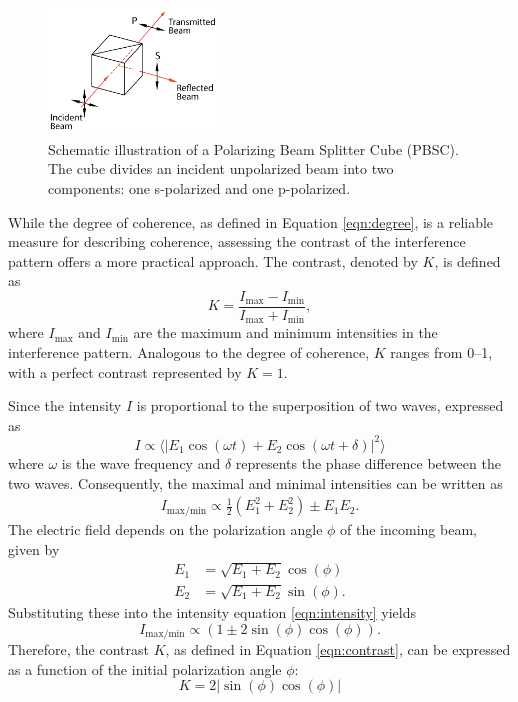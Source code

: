 \begin{figure}
    \centering
    \includegraphics[width=0.4\textwidth]{pictures/PBSC.png}
    \caption{Schematic illustration of a Polarizing Beam Splitter Cube (PBSC). The cube divides an incident unpolarized beam into two components: one s-polarized and one p-polarized. \cite{PBSC}}
    \label{fig:PBSC}
\end{figure}

While the degree of coherence, as defined in Equation \eqref{eqn:degree}, is a reliable 
measure for describing coherence, assessing the contrast of the interference pattern 
offers a more practical approach. The contrast, denoted by $K$, is defined as
\begin{equation}
    K=\frac{I_\text{max}-I_\text{min}}{I_\text{max}+I_\text{min}},
    \label{eqn:contrast}
\end{equation}
where $I_\text{max}$ and $I_\text{min}$ are the maximum and minimum intensities in the 
interference pattern. Analogous to the degree of coherence, $K$ ranges from 
\numrange{0}{1}, with a perfect contrast represented by $K=1$.

Since the intensity $I$ is proportional to the superposition of two waves, expressed as
\begin{equation*}
    I\propto \langle |E_1\cos(\omega t)+E_2\cos(\omega t +\delta)|^2 \rangle
    \label{eqn:intensity}
\end{equation*}
where $\omega$ is the wave frequency and $\delta$ represents the phase difference 
between the two waves. Consequently, the maximal and minimal intensities can be written as
\begin{align*}
    I_\text{max/min}\propto\frac{1}{2}(E_1^2+E_2^2)\pm E_1E_2.
\end{align*}
The electric field depends on the polarization angle $\phi$ of the incoming beam, given by
\begin{align*}
    E_1&=\sqrt{E_1+E_2}\cos(\phi) \\
    E_2&=\sqrt{E_1+E_2}\sin(\phi).
\end{align*}
Substituting these into the intensity equation \eqref{eqn:intensity} yields
\begin{equation*}
    I_\text{max/min}\propto (1\pm 2\sin(\phi)\cos(\phi)).
\end{equation*}
Therefore, the contrast $K$, as defined in Equation \eqref{eqn:contrast}, can be 
expressed as a function of the initial polarization angle $\phi$:
\begin{equation}
    K=2|\sin(\phi)\cos(\phi)|
    \label{eqn:contrast2}
\end{equation}

